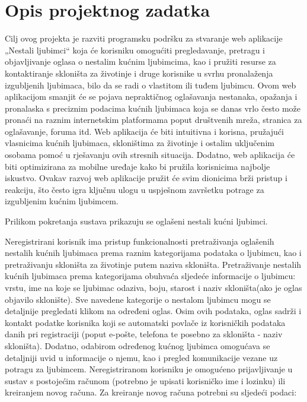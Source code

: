 \chapter{Opis projektnog zadatka}

Cilj ovog projekta je razviti programsku podršku za stvaranje web aplikacije „Nestali ljubimci“ koja će korisniku omogućiti pregledavanje, pretragu i objavljivanje oglasa o nestalim kućnim ljubimcima, kao i pružiti resurse za kontaktiranje skloništa za životinje i druge korisnike u svrhu pronalaženja izgubljenih ljubimaca, bilo da se radi o vlastitom ili tuđem ljubimcu. Ovom web aplikacijom smanjit će se pojava nepraktičnog oglašavanja nestanaka, opažanja i pronalaska s preciznim podacima kućnih ljubimaca koja se danas vrlo često može pronaći na raznim internetskim platformama poput društvenih mreža, stranica za oglašavanje, foruma itd. Web aplikacija će biti intuitivna i korisna, pružajući vlasnicima kućnih ljubimaca, skloništima za životinje i ostalim uključenim osobama pomoć u rješavanju ovih stresnih situacija. Dodatno, web aplikacija će biti optimizirana za mobilne uređaje kako bi pružila korisnicima najbolje iskustvo. Ovakav razvoj web aplikacije pružit će svim dionicima brži pristup i reakciju, što često igra ključnu ulogu u uspješnom završetku potrage za izgubljenim kućnim ljubimcem.

Prilikom pokretanja sustava prikazuju se oglašeni nestali kućni ljubimci.

Neregistrirani korisnik ima pristup funkcionalnosti pretraživanja oglašenih nestalih kućnih ljubimaca prema raznim kategorijama podataka o ljubimcu, kao i pretraživanju skloništa za životinje putem naziva skloništa. Pretraživanje nestalih kućnih ljubimaca prema kategorijama obuhvaća sljedeće informacije o ljubimcu: vrstu, ime na koje se ljubimac odaziva, boju, starost i naziv skloništa(ako je oglas objavilo sklonište). Sve navedene kategorije o nestalom ljubimcu mogu se detaljnije pregledati klikom na određeni oglas. Osim ovih podataka, oglas sadrži i kontakt podatke korisnika koji se automatski povlače iz korisničkih podataka danih pri registraciji (poput e-pošte, telefona te posebno za skloništa - naziv skloništa). Dodatno, odabirom određenog kućnog ljubimca omogućava se detaljniji uvid u informacije o njemu, kao i pregled komunikacije vezane uz potragu za ljubimcem. Neregistriranom korisniku je omogućeno prijavljivanje u sustav s postojećim računom (potrebno je upisati korisničko ime i lozinku) ili kreiranjem novog računa. Za kreiranje novog računa potrebni su sljedeći podaci:

